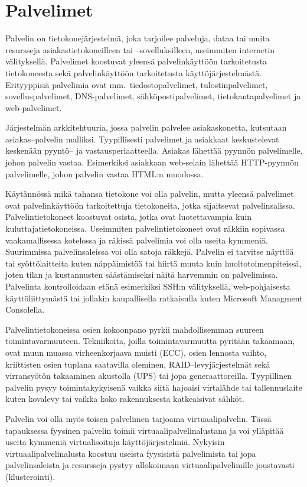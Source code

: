 \section{Palvelimet}\label{palvelimet}

Palvelin on tietokonejärjestelmä, joka tarjoilee palveluja, dataa tai muita resursseja asiakastietokoneilleen tai –sovelluksilleen, useimmiten internetin välityksellä. Palvelimet koostuvat yleensä palvelinkäyttöön tarkoitetusta tietokoneesta sekä palvelinkäyttöön tarkoitetusta käyttöjärjestelmästä. Erityyppisiä palvelimia ovat mm.\ tiedostopalvelimet, tulostinpalvelimet, sovelluspalvelimet, DNS-palvelimet, sähköpostipalvelimet, tietokantapalvelimet ja web-palvelimet.

Järjestelmän arkkitehtuuria, jossa palvelin palvelee asiakaskonetta, kutsutaan asiakas–palvelin malliksi. Tyypillisesti palvelimet ja asiakkaat keskustelevat keskenään pyyntö– ja vastausperiaatteella. Asiakas lähettää pyynnön palvelimelle, johon palvelin vastaa. Esimerkiksi asiakkaan web-selain lähettää HTTP-pyynnön palvelimelle, johon palvelin vastaa HTML:n muodossa.

Käytännössä mikä tahansa tietokone voi olla palvelin, mutta yleensä palvelimet ovat palvelinkäyttöön tarkoitettuja tietokoneita, jotka sijaitsevat palvelinsalissa. Palvelintietokoneet koostuvat osista, jotka ovat luotettavampia kuin kuluttajatietokoneissa. Useimmiten palvelintietokoneet ovat räkkiin sopivassa vaakamallisessa kotelossa ja räkissä palvelimia voi olla useita kymmeniä. Suurimmissa palvelinsaleissa voi olla satoja räkkejä. Palvelin ei tarvitse näyttöä tai syöttölaitteita kuten näppäimistöä tai hiirtä muuta kuin huoltotoimenpiteissä, joten tilan ja kustannusten säästämiseksi näitä harvemmin on palvelimissa. Palvelinta kontrolloidaan etänä esimerkiksi SSH:n välityksellä, web-pohjaisesta käyttöliittymästä tai jollakin kaupallisella ratkaisulla kuten Microsoft Managment Consolella.

Palvelintietokoneissa osien kokoonpano pyrkii mahdollisemman suureen toimintavarmuuteen. Tekniikoita, joilla toimintavarmuutta pyritään takaamaan, ovat muun muassa virheenkorjaava muisti (ECC), osien lennosta vaihto, kriittisten osien tuplana saatavilla oleminen, RAID–levyjärjestelmät sekä virransyötön takaaminen akustolla (UPS) tai jopa generaattoreilla. Tyypillinen palvelin pysyy toimintakykyisenä vaikka siitä hajoaisi virtalähde tai tallennuslaite kuten kovalevy tai vaikka koko rakennuksesta katkeaisivat sähköt.~\cite{paessler}

Palvelin voi olla myös toisen palvelimen tarjoama virtuaalipalvelin. Tässä tapauksessa fyysinen palvelin toimii virtuaalipalvelinalustana ja voi ylläpitää useita kymmeniä virtualisoituja käyttöjärjestelmiä. Nykyisin virtuaalipalvelinalusta koostuu useista fyysisistä palvelimista tai jopa palvelinsaleista ja resursseja pystyy allokoimaan virtuaalipalvelimille joustavasti (klusterointi).

